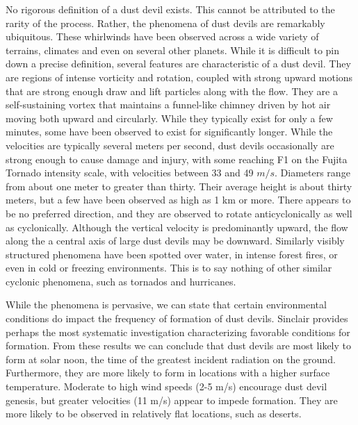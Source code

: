 No rigorous definition of a dust devil exists. This cannot be attributed
to the rarity of the process. Rather, the phenomena of dust devils are
remarkably ubiquitous. These whirlwinds have been
observed across a wide variety of terrains, climates and even on several
other planets\cite{Sinclair1969,Bluestein2004,JGR:JGR13978,JGRE:JGRE1660}. 
While it is difficult to pin down a precise definition, several features 
are characteristic of a dust devil. They are regions of
intense vorticity and rotation, coupled with strong upward motions 
that are strong enough draw and lift particles along with the flow.
They are a self-sustaining vortex that maintains a funnel-like
chimney driven by hot air moving both upward and circularly. 
While they typically exist for only a few minutes, some have 
been observed to exist for significantly longer. While the velocities are 
typically several meters per second, 
%
%
dust devils occasionally are strong enough to cause damage and injury,
with some reaching F1 on the Fujita Tornado intensity
scale\cite{}, with velocities between 33 and 49
$m/s$. 
%
%
Diameters range from about one meter to greater than thirty.  Their
average height is about thirty meters, but a few have been observed 
as high as 1 km or more. There appears to be no preferred direction, and
they are observed to rotate anticyclonically as well as
cyclonically. Although the vertical velocity 
is predominantly upward, the flow along the a central axis of large dust
devils may be downward. 
%
%
Similarly visibly structured phenomena have been spotted over water, in
intense forest fires, or even in cold or freezing environments. 
%
%
This is to say nothing of other similar cyclonic phenomena, such as
tornados and hurricanes. 

While the phenomena is pervasive, we can state that certain 
environmental conditions do impact the frequency of formation
of dust devils. Sinclair\cite{Sinclair1969} provides perhaps the most 
systematic investigation characterizing favorable conditions for
formation. From these results we can conclude that dust devils are most
likely to form at solar noon, the time of the greatest incident radiation 
on the ground. Furthermore, they are more likely to form in locations 
with a higher surface temperature. Moderate to high wind speeds (2-5
m/s) encourage dust devil genesis, but greater velocities (11 m/s)
appear to impede formation. They are more likely to be observed in
relatively flat locations, such as deserts.  

